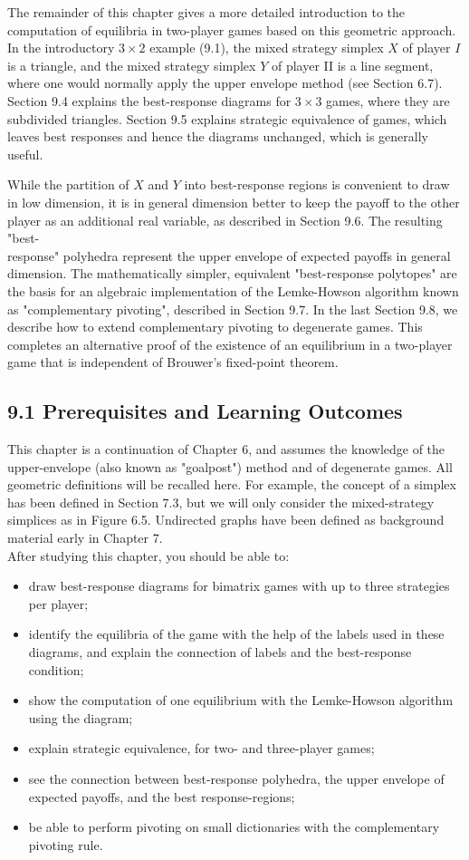 \documentclass[12pt]{article}
\begin{document}
The remainder of this chapter gives a more detailed introduction to the computation of equilibria in two-player games based on this geometric approach. In the introductory $3 \times 2$ example (9.1), the mixed strategy simplex $X$ of player $I$ is a triangle, and the mixed strategy simplex $Y$ of player II is a line segment, where one would normally apply the upper envelope method (see Section 6.7). Section 9.4 explains the best-response diagrams for $3 \times 3$ games, where they are subdivided triangles. Section 9.5 explains strategic equivalence of games, which leaves best responses and hence the diagrams unchanged, which is generally useful.

While the partition of $X$ and $Y$ into best-response regions is convenient to draw in low dimension, it is in general dimension better to keep the payoff to the other player as an additional real variable, as described in Section 9.6. The resulting "best-\\
response" polyhedra represent the upper envelope of expected payoffs in general dimension. The mathematically simpler, equivalent "best-response polytopes" are the basis for an algebraic implementation of the Lemke-Howson algorithm known as "complementary pivoting", described in Section 9.7. In the last Section 9.8, we describe how to extend complementary pivoting to degenerate games. This completes an alternative proof of the existence of an equilibrium in a two-player game that is independent of Brouwer's fixed-point theorem.

\subsection*{9.1 Prerequisites and Learning Outcomes}
This chapter is a continuation of Chapter 6, and assumes the knowledge of the upper-envelope (also known as "goalpost") method and of degenerate games. All geometric definitions will be recalled here. For example, the concept of a simplex has been defined in Section 7.3, but we will only consider the mixed-strategy simplices as in Figure 6.5. Undirected graphs have been defined as background material early in Chapter 7.\\
After studying this chapter, you should be able to:

\begin{itemize}
  \item draw best-response diagrams for bimatrix games with up to three strategies per player;
  \item identify the equilibria of the game with the help of the labels used in these diagrams, and explain the connection of labels and the best-response condition;
  \item show the computation of one equilibrium with the Lemke-Howson algorithm using the diagram;
  \item explain strategic equivalence, for two- and three-player games;
  \item see the connection between best-response polyhedra, the upper envelope of expected payoffs, and the best response-regions;
  \item be able to perform pivoting on small dictionaries with the complementary pivoting rule.
\end{itemize}
\end{document}
